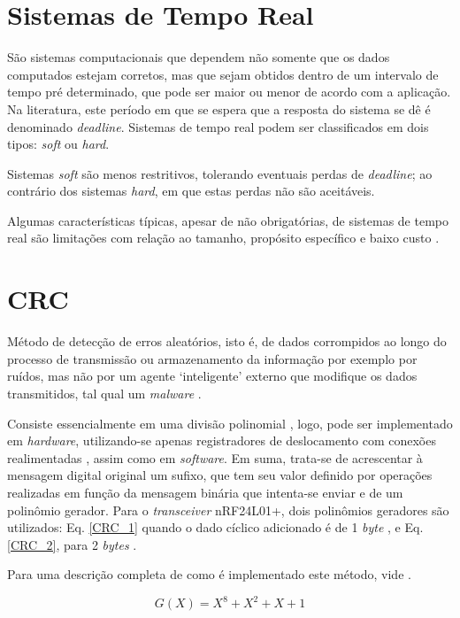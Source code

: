 \section{Sistemas de Tempo Real}
São sistemas computacionais que dependem não somente que os dados computados estejam corretos, mas que sejam obtidos dentro de um intervalo de tempo 
pré determinado, que pode ser maior ou menor de acordo com a aplicação.
Na literatura, este período em que se espera que a resposta do sistema se dê é denominado \textit{deadline}.
Sistemas de tempo real podem ser classificados em dois tipos: \textit{soft} ou \textit{hard}.

Sistemas \textit{soft} são menos restritivos, tolerando eventuais perdas de \textit{deadline}; 
ao contrário dos sistemas \textit{hard}, em que estas perdas não são aceitáveis.  

Algumas características típicas, apesar de não obrigatórias, de sistemas de tempo real são limitações com relação ao tamanho, propósito específico e 
baixo custo \cite{silberschatz}.

\section{CRC}
Método de detecção de erros aleatórios, isto é, de dados corrompidos ao longo do processo de transmissão ou armazenamento da informação por exemplo 
por ruídos, mas não por um agente \textquoteleft inteligente\textquoteright{} externo que modifique os dados transmitidos, tal qual um 
\textit{malware} \cite{stigge}.

Consiste essencialmente em uma divisão polinomial \cite{stigge}, logo, pode ser implementado em \textit{hardware}, utilizando-se apenas registradores 
de deslocamento com conexões realimentadas \cite{peterson}, assim como em \textit{software}. 
Em suma, trata-se de acrescentar à mensagem digital original um sufixo, que tem seu valor definido por operações realizadas em função da mensagem 
binária que intenta-se enviar e de um polinômio gerador.
Para o \textit{transceiver} nRF24L01+, dois polinômios geradores são utilizados: Eq. \ref{CRC_1} quando o dado cíclico adicionado é de 1 
\textit{byte} , e Eq. \ref{CRC_2}, para 2 \textit{bytes} \cite{nRF}.

Para uma descrição completa de como é implementado este método, vide \cite{stigge,peterson}.

\begin{equation}
\label{CRC_1}
G(X) = X^8 + X^2 + X + 1 
\end{equation}

